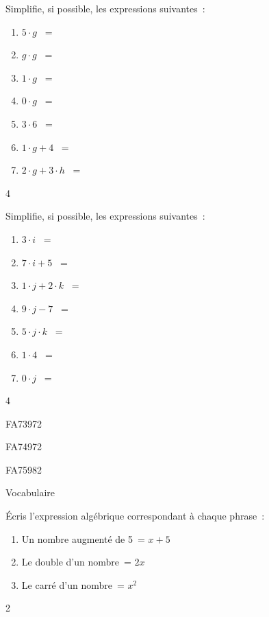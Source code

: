 \documentclass[a4paper,11pt]{report}
\begin{document}
\begin{exop}{ Simplifie, si possible, les expressions suivantes~:
\begin{enumerate}
    \item $5\cdot g$ ~=\hrulefill
    \item $g\cdot g$ ~=\hrulefill
    \item $1\cdot g$ ~=\hrulefill
    \item $0\cdot g$ ~=\hrulefill
    \item $3\cdot 6$ ~=\hrulefill
    \item $1\cdot g + 4$ ~=\hrulefill
    \item $2\cdot g + 3\cdot h$ ~=\hrulefill
\end{enumerate}
}
{4}
\end{exop}

\begin{exop}{ Simplifie, si possible, les expressions suivantes~:
\begin{enumerate}
    \item $3\cdot i$ ~=\hrulefill
    \item $7\cdot i + 5$ ~=\hrulefill
    \item $1\cdot j+ 2\cdot k$ ~=\hrulefill
    \item $9\cdot j-7$ ~=\hrulefill
    \item $5\cdot j\cdot k$ ~=\hrulefill
    \item $1\cdot 4$ ~=\hrulefill
    \item $0\cdot j$ ~=\hrulefill
\end{enumerate}
}
{4}
\end{exop}

\begin{exof}{FA73}{97}{2}
\end{exof}
\begin{exof}{FA74}{97}{2}
\end{exof}
\begin{exof}{FA75}{98}{2}
\end{exof}

\begin{resolu}{Vocabulaire}{Écris l'expression algébrique correspondant à chaque phrase~:
\begin{enumerate}
    \item Un nombre augmenté de 5~= $x+5$
    \item Le double d'un nombre~= $2x$
    \item Le carré d'un nombre~= $x^2$
\end{enumerate}
}
{2}
\end{resolu}
\end{document}
